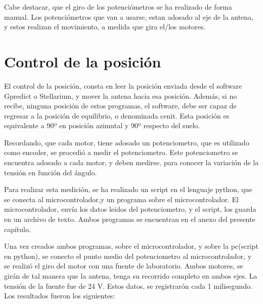 Cabe destacar, que el giro de los potenciómetros se ha realizado de forma manual. Los potenciómetros que van a usarse, estan adosado al eje de la antena, y estos realizan el movimiento, a medida que gira el/los motores.  

\section{Control de la posición}
El control de la posición, consta en leer la posición enviada desde el software Gpredict o Stellarium, y mover la antena hacia esa posición. Además, si no recibe, ninguna posición de estos programas, el software, debe ser capaz de regresar a la posición de equilibrio, o denominada cenit. Esta posición es equivalente a 90º en posición azimutal y 90º respecto del suelo. 

Recordando, que cada motor, tiene adosado un potenciometro, que es utilizado como encoder, se procedió a medir el potenciometro. Este potenciometro se encuentra adosado a cada motor, y deben medirse, para conocer la variación de la tensión en función del ángulo. 

Para realizar esta medición, se ha realizado un script en el lenguaje python, que se conecta al microcontrolador,y un programa sobre el microcontrolador. El microcontrolador, envía los datos leidos del potenciometro, y el script, los guarda en un archivo de texto. Ambos programas se encuentran en el anexo del presente capítulo.

Una vez creados ambos programas, sobre el microcontrolador, y sobre la pc(script en python), se conecto el punto medio del potenciometro al microcontrolador, y se realizó el giro del motor con una fuente de laboratorio. Ambos motores, se girán de tal manera que la antena, tenga su recorrido completo en ambos ejes. La tensión de la fuente fue de 24 V. Estos datos, se registrarón cada 1 milisegundo. Los resultados fueron los siguientes: 


